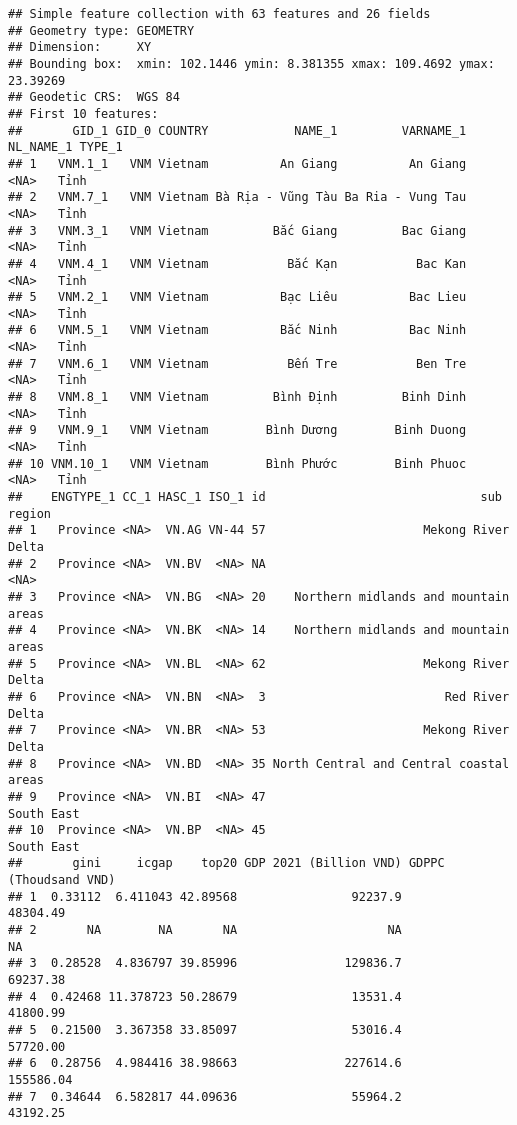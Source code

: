 \documentclass[
]{article}
\begin{document}
\begin{verbatim}
## Simple feature collection with 63 features and 26 fields
## Geometry type: GEOMETRY
## Dimension:     XY
## Bounding box:  xmin: 102.1446 ymin: 8.381355 xmax: 109.4692 ymax: 23.39269
## Geodetic CRS:  WGS 84
## First 10 features:
##       GID_1 GID_0 COUNTRY            NAME_1         VARNAME_1 NL_NAME_1 TYPE_1
## 1   VNM.1_1   VNM Vietnam          An Giang          An Giang      <NA>   Tỉnh
## 2   VNM.7_1   VNM Vietnam Bà Rịa - Vũng Tàu Ba Ria - Vung Tau      <NA>   Tỉnh
## 3   VNM.3_1   VNM Vietnam         Bắc Giang         Bac Giang      <NA>   Tỉnh
## 4   VNM.4_1   VNM Vietnam           Bắc Kạn           Bac Kan      <NA>   Tỉnh
## 5   VNM.2_1   VNM Vietnam          Bạc Liêu          Bac Lieu      <NA>   Tỉnh
## 6   VNM.5_1   VNM Vietnam          Bắc Ninh          Bac Ninh      <NA>   Tỉnh
## 7   VNM.6_1   VNM Vietnam           Bến Tre           Ben Tre      <NA>   Tỉnh
## 8   VNM.8_1   VNM Vietnam         Bình Định         Binh Dinh      <NA>   Tỉnh
## 9   VNM.9_1   VNM Vietnam        Bình Dương        Binh Duong      <NA>   Tỉnh
## 10 VNM.10_1   VNM Vietnam        Bình Phước        Binh Phuoc      <NA>   Tỉnh
##    ENGTYPE_1 CC_1 HASC_1 ISO_1 id                              sub region
## 1   Province <NA>  VN.AG VN-44 57                      Mekong River Delta
## 2   Province <NA>  VN.BV  <NA> NA                                    <NA>
## 3   Province <NA>  VN.BG  <NA> 20    Northern midlands and mountain areas
## 4   Province <NA>  VN.BK  <NA> 14    Northern midlands and mountain areas
## 5   Province <NA>  VN.BL  <NA> 62                      Mekong River Delta
## 6   Province <NA>  VN.BN  <NA>  3                         Red River Delta
## 7   Province <NA>  VN.BR  <NA> 53                      Mekong River Delta
## 8   Province <NA>  VN.BD  <NA> 35 North Central and Central coastal areas
## 9   Province <NA>  VN.BI  <NA> 47                              South East
## 10  Province <NA>  VN.BP  <NA> 45                              South East
##       gini     icgap    top20 GDP 2021 (Billion VND) GDPPC (Thoudsand VND)
## 1  0.33112  6.411043 42.89568                92237.9              48304.49
## 2       NA        NA       NA                     NA                    NA
## 3  0.28528  4.836797 39.85996               129836.7              69237.38
## 4  0.42468 11.378723 50.28679                13531.4              41800.99
## 5  0.21500  3.367358 33.85097                53016.4              57720.00
## 6  0.28756  4.984416 38.98663               227614.6             155586.04
## 7  0.34644  6.582817 44.09636                55964.2              43192.25

\end{verbatim}
\end{document}
